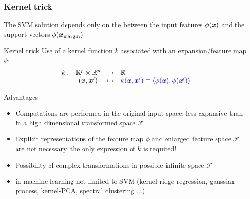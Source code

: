 \begin{frame}
  \frametitle{Kernel trick}
  
The SVM solution depends only on the  between the input features $\phi({\boldsymbol{x}})$ and the support vectors 
  $\phi({\boldsymbol{x}}_{\textrm{margin}})$
  
  \begin{block}{Kernel trick}
  Use of  a kernel function $k$ associated with an expansion/feature map $\phi$:
  $$\begin{array}{ccll} k:& \mathbb{R}^p \times \mathbb{R}^p  &\rightarrow& \mathbb{R}\\ 
              & ({\boldsymbol{x}},{\boldsymbol{x}}') &\mapsto& {\textcolor{blue}{ k ({\boldsymbol{x}},{\boldsymbol{x}}') \equiv \langle \phi({\boldsymbol{x}}), \phi({\boldsymbol{x}}') \rangle}}
             \end{array}$$
  \end{block}
 
 \begin{block}{Advantages}
  \begin{itemize}
   \item Computations are performed in the original input space: less  expansive than in a high 
   dimensional transformed space $\mathcal{F}$
   \item Explicit representations of the feature map $\phi$ and enlarged feature space $\mathcal{F}$ are not necessary, the only expression of $k$
   is required!
   \item[\doigt] Possibility of complex transformations in possible infinite space  $\mathcal{F}$
   \item[\doigt]  in machine learning not limited to SVM (kernel ridge regression, gaussian process, kernel-PCA, spectral clustering $\ldots$)
  \end{itemize}

 \end{block}


\end{frame}

